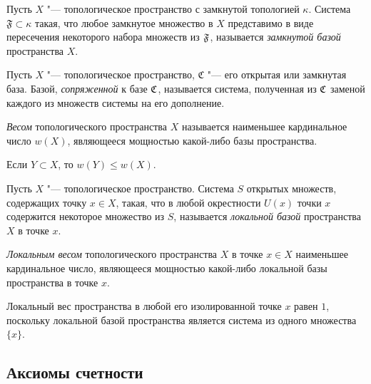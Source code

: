 \begin{definition}
    Пусть $X$ "--- топологическое пространство с замкнутой топологией $\kappa$. Система $\mathfrak{F} \subset \kappa$ такая, что любое замкнутое множество в $X$ представимо в виде пересечения некоторого набора множеств из $\mathfrak F$, называется \textit{замкнутой базой} пространства $X$.
\end{definition}

\begin{definition}
    Пусть $X$ "--- топологическое пространство, $\mathfrak{C}$ "--- его открытая или замкнутая база. Базой, \textit{сопряженной} к базе $\mathfrak C$, называется система, полученная из $\mathfrak C$ заменой каждого из множеств системы на его дополнение.
\end{definition}

\begin{definition}
    \textit{Весом} топологического пространства $X$ называется наименьшее кардинальное число $w(X)$, являющееся мощностью какой-либо базы пространства.
\end{definition}

\begin{note}
    Если $Y \subset X$, то $w(Y)\leq w(X)$.
\end{note}

\begin{definition}
    Пусть $X$ "--- топологическое пространство. Система $S$ открытых множеств, содержащих точку $x \in X$, такая, что в любой окрестности $U(x)$ точки $x$ содержится некоторое множество из $S$, называется \textit{локальной базой} пространства $X$ в точке $x$.
\end{definition}

\begin{definition}
    \textit{Локальным ве\-сом} топологического пространства $X$ в точке $x \in X$ наименьшее кардинальное число, являющееся мощностью какой-либо локальной базы пространства в точке $x$.
\end{definition}

\begin{note}
    Локальный вес пространства в любой его изолированной точке $x$ равен $1$, поскольку локальной базой пространства является система из одного множества $\{x\}$.
\end{note}

\subsection{Аксиомы счетности}

